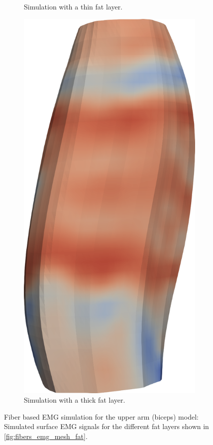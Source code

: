\begin{figure}[H]
\begin{subfigure}[t]{0.25\textwidth}
    \caption{Simulation with a thin fat layer.}%
    \label{fig:fibers_emg_thin_fat}%
  \end{subfigure}  \quad
  \begin{subfigure}[t]{0.28\textwidth}%
    \centering%
    \includegraphics[width=\textwidth]{images/results/application/fibers_emg_thick_fat.png}%
    \caption{Simulation with a thick fat layer.}%
    \label{fig:fibers_emg_thick_fat}%
  \end{subfigure}   
  \caption{Fiber based EMG simulation for the upper arm (biceps) model: Simulated surface EMG signals for the different fat layers shown in \cref{fig:fibers_emg_mesh_fat}.}%
  \label{fig:fibers_emg_fat}%
\end{figure}%

